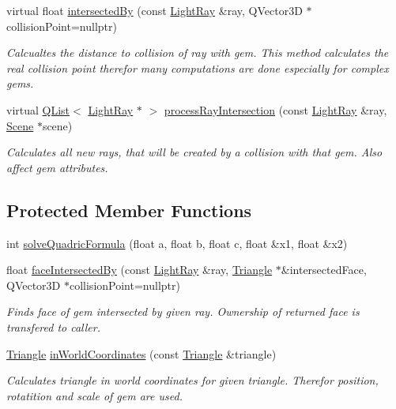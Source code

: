 \begin{DoxyCompactItemize}
virtual float \hyperlink{class_abstract_gem_adc52cc6d78f3494563c50cfd7e0584b4}{intersected\+By} (const \hyperlink{class_light_ray}{Light\+Ray} \&ray, Q\+Vector3\+D $\ast$collision\+Point=nullptr)
\begin{DoxyCompactList}\small\item\em Calcualtes the distance to collision of ray with gem.  This method calculates the real collision point therefor many computations are done especially for complex gems. \end{DoxyCompactList}\item 
virtual \hyperlink{class_q_list}{Q\+List}$<$ \hyperlink{class_light_ray}{Light\+Ray} $\ast$ $>$ \hyperlink{class_abstract_gem_ab4f3c6d38acbe59a610c67588e4944d7}{process\+Ray\+Intersection} (const \hyperlink{class_light_ray}{Light\+Ray} \&ray, \hyperlink{class_scene}{Scene} $\ast$scene)
\begin{DoxyCompactList}\small\item\em Calculates all new rays, that will be created by a collision with that gem. Also affect gem attributes. \end{DoxyCompactList}\end{DoxyCompactItemize}
\subsection*{Protected Member Functions}
\begin{DoxyCompactItemize}
\item 
int \hyperlink{class_abstract_gem_a85e872137d38a2c4a9a38f1f0b996bdc}{solve\+Quadric\+Formula} (float a, float b, float c, float \&x1, float \&x2)
\item 
float \hyperlink{class_abstract_gem_a446d8e7a7296203789414ae5b93e0bde}{face\+Intersected\+By} (const \hyperlink{class_light_ray}{Light\+Ray} \&ray, \hyperlink{class_triangle}{Triangle} $\ast$\&intersected\+Face, Q\+Vector3\+D $\ast$collision\+Point=nullptr)
\begin{DoxyCompactList}\small\item\em Finds face of gem intersected by given ray. Ownership of returned face is transfered to caller. \end{DoxyCompactList}\item 
\hyperlink{class_triangle}{Triangle} \hyperlink{class_abstract_gem_a18523ca4a999d5159e38003b3fad5f20}{in\+World\+Coordinates} (const \hyperlink{class_triangle}{Triangle} \&triangle)
\begin{DoxyCompactList}\small\item\em Calculates triangle in world coordinates for given triangle. Therefor position, rotatition and scale of gem are used. \end{DoxyCompactList}\end{DoxyCompactItemize}
